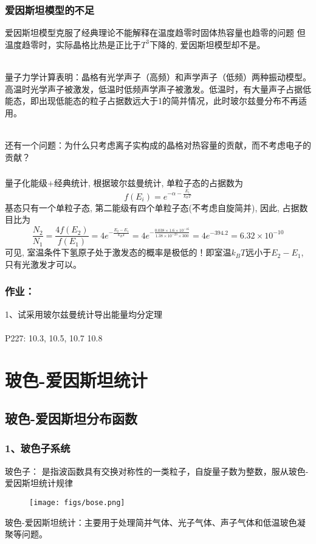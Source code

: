 \begin{frame}[label=current]
  \frametitle{爱因斯坦模型的不足}
  爱因斯坦模型克服了经典理论不能解释在温度趋零时固体热容量也趋零的问题 
  但温度趋零时，实际晶格比热是正比于$T^3$下降的, 爱因斯坦模型却不是。
  
  ~~\\
  量子力学计算表明：晶格有光学声子（高频）和声学声子（低频）两种振动模型。高温时光学声子被激发，低温时低频声学声子被激发。低温时，有大量声子占据低能态，即出现低能态的粒子占据数远大于1的简并情况，此时玻尔兹曼分布不再适用。
  
  ~~\\
  还有一个问题：为什么只考虑离子实构成的晶格对热容量的贡献，而不考虑电子的贡献？
\end{frame} 

\begin{frame}
  \frametitle{}
  \解 量子化能级+经典统计, 根据玻尔兹曼统计, 单粒子态的占据数为
  \[ f(E_i) = e^{-\alpha - \frac{E_i}{k_BT}}\]
  基态只有一个单粒子态, 第二能级有四个单粒子态(不考虑自旋简并), 因此, 占据数目比为
  \[ \frac{N_2}{N_1} = \frac{4 f(E_2)}{f(E_1)}  = 4 e^{-\frac{E_2 - E_1}{k_BT}} = 4 e^{-\frac{0.038\times 1.6\times 10^{-16}}{1.38\times 10^{-23}\times 300}} = 4 e^{- 394.2} = 6.32\times 10^{-10}\]
  可见, 室温条件下氢原子处于激发态的概率是极低的！即室温$k_B T$远小于$E_2 -E_1$, 只有光激发才可以。\\
\end{frame} 

\begin{frame}
  \frametitle{作业：}
  1、试采用玻尔兹曼统计导出能量均分定理\\
  ~~\\ 
  P227: 10.3, 10.5, 10.7 10.8
\end{frame} 

\section{玻色-爱因斯坦统计}

\subsection{玻色-爱因斯坦分布函数}

\begin{frame}
  \frametitle{ 1、玻色子系统}

  \alert{玻色子：} 是指波函数具有交换对称性的一类粒子，自旋量子数为整数，服从玻色-爱因斯坦统计规律
   \begin{figure}[htbp]
    \centering
    \texttt{[image: figs/bose.png]}
   \end{figure}
   \alert{玻色-爱因斯坦统计：}主要用于处理简并气体、光子气体、声子气体和低温玻色凝聚等问题。
\end{frame} 

